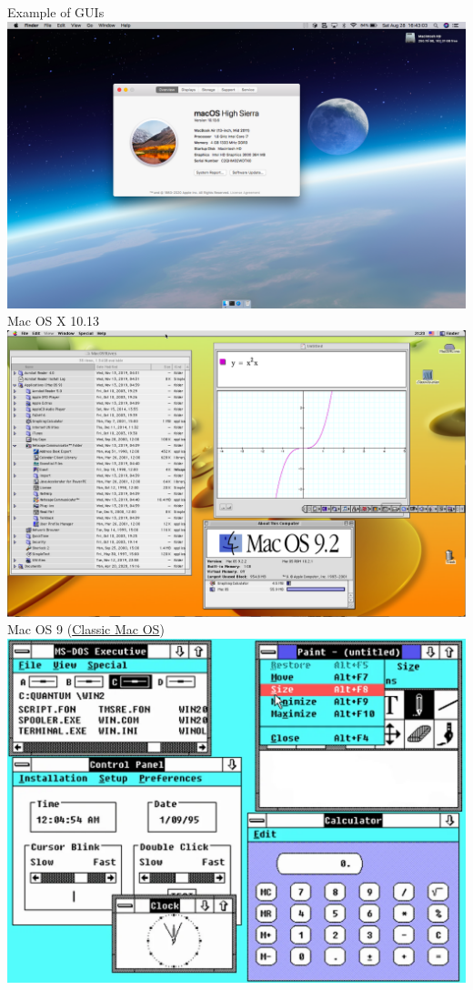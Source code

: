 \documentclass[graphics]{beamer}
\begin{document}
\begin{frame}{Example of GUIs}
     {
        \includegraphics[scale=0.24]{L03_OperatingSystems/L3_macos.png}
        \footnotesize{Mac OS X 10.13}
    }
     {
        \includegraphics[scale=0.24]{L03_OperatingSystems/L03_classic_mac_os9.png}
        \footnotesize{Mac OS 9 (\href{https://en.wikipedia.org/wiki/Classic_Mac_OS}{Classic Mac OS})}
    }
     {
        \includegraphics[scale=0.25]{L03_OperatingSystems/L03_windows2.png} \\
}
\end{frame}
\end{document}
